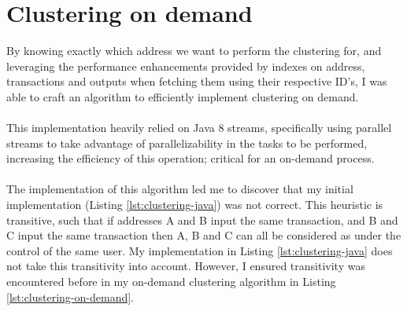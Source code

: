 \section{Clustering on demand}
By knowing exactly which address we want to perform the clustering for, and leveraging the performance enhancements provided by indexes on address, transactions and outputs when fetching them using their respective ID's, I was able to craft an algorithm to efficiently implement clustering on demand.
\\\\
This implementation heavily relied on Java 8 streams, specifically using parallel streams to take advantage of parallelizability in the tasks to be performed, increasing the efficiency of this operation; critical for an on-demand process. 
\\\\
The implementation of this algorithm led me to discover that my initial implementation (Listing \ref{lst:clustering-java}) was not correct. This heuristic is transitive, such that if addresses A and B input the same transaction, and B and C input the same transaction then A, B and C can all be considered as under the control of the same user. My implementation in Listing \ref{lst:clustering-java} does not take this transitivity into account. However, I ensured transitivity was encountered before in my on-demand clustering algorithm in Listing \ref{lst:clustering-on-demand}.

